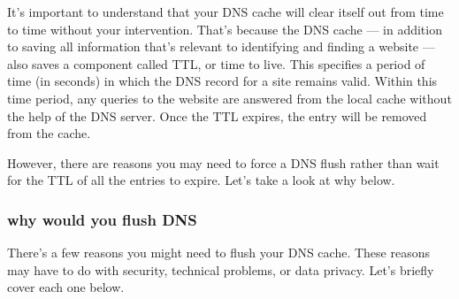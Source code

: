 \documentclass[a4paper,12pt]{book}
\begin{document}
It’s important to understand that your DNS cache will clear itself out from time to time without your intervention. That’s because the DNS cache — in addition to saving all information that’s relevant to identifying and finding a website — also saves a component called TTL, or time to live. This specifies a period of time (in seconds) in which the DNS record for a site remains valid. Within this time period, any queries to the website are answered from the local cache without the help of the DNS server. Once the TTL expires, the entry will be removed from the cache.

However, there are reasons you may need to force a DNS flush rather than wait for the TTL of all the entries to expire. Let’s take a look at why below.

\subsubsection{why would you flush DNS}

There’s a few reasons you might need to flush your DNS cache. These reasons may have to do with security, technical problems, or data privacy. Let’s briefly cover each one below.
\end{document}
